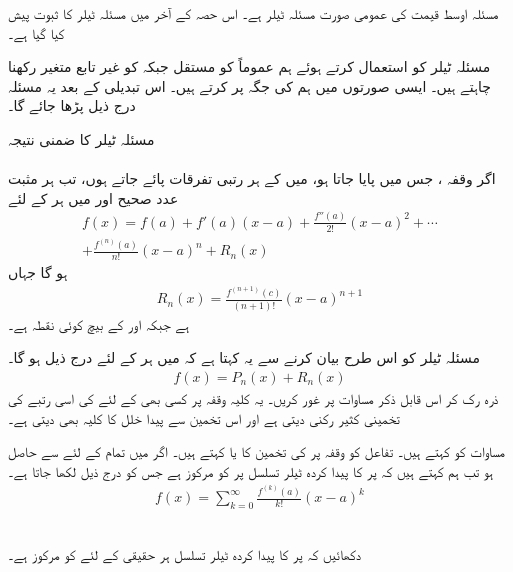 مسئلہ اوسط قیمت کی عمومی صورت مسئلہ ٹیلر ہے۔ اس حصہ کے آخر میں مسئلہ ٹیلر کا ثبوت پیش کیا گیا ہے۔

مسئلہ ٹیلر کو استعمال کرتے ہوئے ہم عموماً  کو مستقل جبکہ  کو غیر تابع متغیر رکھنا چاہتے ہیں۔ ایسی صورتوں میں ہم  کی جگہ  پر کرتے ہیں۔ اس تبدیلی کے بعد یہ مسئلہ درج ذیل پڑھا جائے گا۔

 مسئلہ ٹیلر کا ضمنی نتیجہ\\
\\
اگر وقفہ ، جس میں  پایا جاتا ہو، میں  کے ہر رتبی تفرقات پائے جاتے ہوں، تب ہر مثبت عدد صحیح  اور  میں ہر  کے لئے
\begin{multline}\label{مساوات_تسلسل_ٹیلر_ضمنی_نتیجہ_الف}
f(x)=f(a)+f'(a)(x-a)+\frac{f''(a)}{2!}(x-a)^2+\cdots\\
+\frac{f^{(n)}(a)}{n!}(x-a)^n+R_n(x)
\end{multline}
ہو گا جہاں 
\begin{align}\label{مساوات_تسلسل_ٹیلر_ضمنی_نتیجہ_ب}
R_n(x)=\frac{f^{(n+1)}(c)}{(n+1)!}(x-a)^{n+1}
\end{align}
ہے جبکہ  اور  کے بیچ  کوئی نقطہ ہے۔

مسئلہ ٹیلر کو اس طرح بیان کرنے سے یہ کہتا ہے کہ  میں ہر  کے لئے درج ذیل ہو گا۔
\begin{align*}
f(x)=P_n(x)+R_n(x)
\end{align*}
ذرہ رک کر اس قابل ذکر مساوات پر غور کریں۔ یہ کلیہ وقفہ  پر کسی بھی  کے لئے  کی اسی رتبے کی تخمینی کثیر رکنی دیتی ہے اور اس تخمین سے پیدا خلل کا کلیہ بھی دیتی ہے۔ 

مساوات  کو  کہتے ہیں۔ تفاعل  کو وقفہ  پر  کی تخمین  کا  یا  کہتے ہیں۔ اگر  میں تمام  کے لئے   سے  حاصل ہو تب ہم کہتے ہیں کہ  پر  کا پیدا کردہ ٹیلر تسلسل  پر  کو مرکوز ہے جس کو درج ذیل لکھا جاتا ہے۔
\begin{align*}
f(x)=\sum_{k=0}^{\infty}\frac{f^{(k)}(a)}{k!}(x-a)^k
\end{align*}

 \\
دکھائیں کہ   پر  کا پیدا کردہ ٹیلر تسلسل ہر حقیقی  کے لئے  کو مرکوز ہے۔

